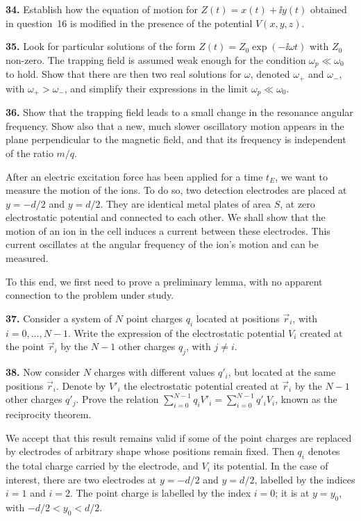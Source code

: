 \documentclass[11pt,a4paper]{article}
\newcommand{\q}[1]{\par\medskip\noindent\textbf{#1.}\enspace}
\newcommand{\vv}[1]{\vec{#1}}
\begin{document}
\q{34} Establish how the equation of motion for $Z(t) = x(t) + \ii y(t)$ obtained in
question~16 is modified in the presence of the potential $V(x,y,z)$.

\q{35} Look for particular solutions of the form $Z(t) = Z_0\exp(-\ii\omega t)$ with $Z_0$
non-zero. The trapping field is assumed weak enough for the condition $\omega_p \ll \omega_0$
to hold. Show that there are then two real solutions for $\omega$, denoted $\omega_+$ and
$\omega_-$, with $\omega_+ > \omega_-$, and simplify their expressions in the limit
$\omega_p \ll \omega_0$.

\q{36} Show that the trapping field leads to a small change in the resonance angular frequency.
Show also that a new, much slower oscillatory motion appears in the plane perpendicular to the
magnetic field, and that its frequency is independent of the ratio $m/q$.

After an electric excitation force has been applied for a time $t_E$, we want to measure the
motion of the ions. To do so, two detection electrodes are placed at $y = -d/2$ and
$y = d/2$. They are identical metal plates of area $S$, at zero electrostatic potential and
connected to each other. We shall show that the motion of an ion in the cell induces a current
between these electrodes. This current oscillates at the angular frequency of the ion's motion
and can be measured.

To this end, we first need to prove a preliminary lemma, with no apparent connection to the
problem under study.

\q{37} Consider a system of $N$ point charges $q_i$ located at positions $\vv r_i$, with
$i = 0,\dots,N-1$. Write the expression of the electrostatic potential $V_i$ created at the
point $\vv r_i$ by the $N-1$ other charges $q_j$, with $j\ne i$.

\q{38} Now consider $N$ charges with different values $q'_i$, but located at the same positions
$\vv r_i$. Denote by $V'_i$ the electrostatic potential created at $\vv r_i$ by the $N-1$ other
charges $q'_j$. Prove the relation $\sum_{i=0}^{N-1}q_iV'_i = \sum_{i=0}^{N-1}q'_iV_i$, known
as the reciprocity theorem.

We accept that this result remains valid if some of the point charges are replaced by
electrodes of arbitrary shape whose positions remain fixed. Then $q_i$ denotes the total charge
carried by the electrode, and $V_i$ its potential. In the case of interest, there are two
electrodes at $y = -d/2$ and $y = d/2$, labelled by the indices $i = 1$ and $i = 2$. The point
charge is labelled by the index $i = 0$; it is at $y = y_0$, with $-d/2 < y_0 < d/2$.
\end{document}
